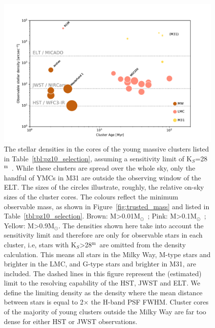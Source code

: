 \documentclass[referee]{aa}
\newcommand{\m}{$^\mathrm{m}$~}
\newcommand{\msun}{M$_\odot$~}
\newcommand{\msune}{M$_\odot$}
\begin{document}
\begin{figure}

    \centering
    \includegraphics[width=\textwidth]{star_density_vs_age.pdf}


    \caption{
    The stellar densities in the cores of the young massive clusters listed in Table~\ref{tbl:pz10_selection}, assuming a sensitivity limit of K$_S$=28\m.
    While these clusters are spread over the whole sky, only the handful of YMCs in M31 are outside the observing window of the ELT.
    The sizes of the circles illustrate, roughly, the relative on-sky sizes of the cluster cores.
    The colours reflect the minimum observable mass, as shown in Figure~\ref{fig:trusted_mass} and listed in Table~\ref{tbl:pz10_selection}.
    Brown: M\textgreater0.01\msun; Pink: M\textgreater0.1\msun; Yellow: M\textgreater0.9\msune.
    The densities shown here take into account the sensitivity limit and therefore are only for observable stars in each cluster, i.e, stars with K$_S$\textgreater28\m are omitted from the density calculation.
    This means all stars in the Milky Way, M-type stars and brighter in the LMC, and G-type stars and brighter in M31, are included.
    The dashed lines in this figure represent the (estimated) limit to the resolving capability of the HST, JWST and ELT.
    We define the limiting density as the density where the mean distance between stars is equal to 2$\times$ the H-band PSF FWHM.
    Cluster cores of the majority of young clusters outside the Milky Way are far too dense for either HST or JWST observations. }

    \label{fig:star_density_vs_age}

\end{figure}
\end{document}
